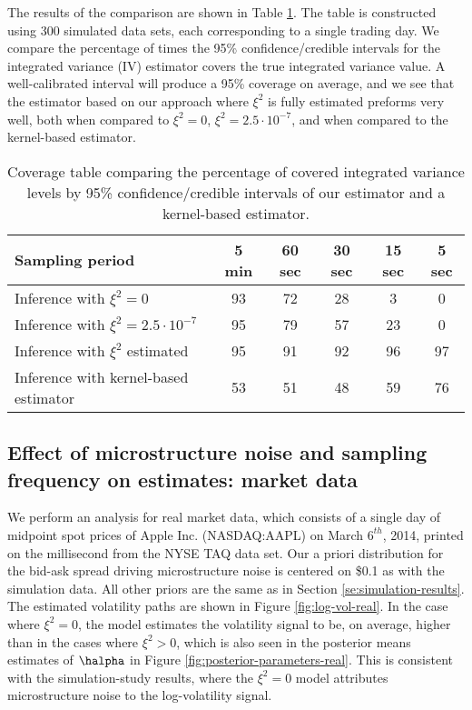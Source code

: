 The results of the comparison are shown in Table \ref{ta:coverage}. The table is constructed using 300 simulated data sets, each corresponding to a single trading day. We compare the percentage of times the 95\% confidence/credible intervals for the integrated variance (IV) estimator covers the true integrated variance value.  A well-calibrated interval will produce a 95\% coverage on average, and we see that the estimator based on our approach where $\xi^2$ is fully estimated preforms very well, both when compared to $\xi^2 =0$, $\xi^2 = 2.5 \cdot 10^{-7}$, and when compared to the kernel-based estimator.

\begin{table}[h]
\begin{center}
\begin{tabular}{l|ccccc}
Sampling period   &   5 min  &	60 sec 	&   30 sec   &   15 sec & 5 sec  \\ \hline \hline
Inference with $\xi^2 = 0$  &  93  &  72  &   28  &	 3 & 0 \\
Inference with $\xi^2 = 2.5 \cdot 10^{-7}$ & 95 & 79 & 57 & 23 & 0 \\
Inference with $\xi^2$ estimated & 95 & 91 & 92 & 96 & 97  \\ \hline
Inference with kernel-based estimator &  53 & 51 & 48 & 59  & 76
\end{tabular}
\caption{Coverage table comparing the percentage of covered integrated variance levels by 95\% confidence/credible intervals of our estimator and a kernel-based estimator.}\label{ta:coverage}
\end{center}
\end{table}

\subsection{ Effect of microstructure noise and sampling frequency on estimates: market data }

We perform an analysis for real market data, which consists of a single day of midpoint spot prices of Apple Inc. (NASDAQ:AAPL) on March $6^{th}$, 2014, printed on the millisecond from the NYSE TAQ data set.  Our a priori distribution for the bid-ask spread driving microstructure noise is centered on \$0.1 as with the simulation data. All other priors are the same as in Section \ref{se:simulation-results}.  The estimated volatility paths are shown in Figure \ref{fig:log-vol-real}.  In the case where $\xi^2 = 0$, the model estimates the volatility signal to be, on average, higher than in the cases where $\xi^2 > 0$, which is also seen in the posterior means estimates of $\halpha$ in Figure \ref{fig:posterior-parameters-real}. This is consistent with the simulation-study results, where the $\xi^2 = 0$ model attributes microstructure noise to the log-volatility signal.

